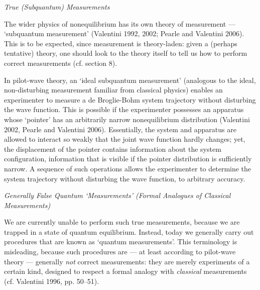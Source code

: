 \documentclass{article}%
\begin{document}
\begin{center}
\textit{True (Subquantum) Measurements}
\end{center}

The wider physics of nonequilibrium has its own theory of measurement ---
`subquantum measurement' (Valentini 1992, 2002; Pearle and Valentini 2006).
This is to be expected, since measurement is theory-laden: given a (perhaps
tentative) theory, one should look to the theory itself to tell us how to
perform correct measurements (cf. section 8).

In pilot-wave theory, an `ideal subquantum measurement' (analogous to the
ideal, non-disturbing measurement familiar from classical physics) enables an
experimenter to measure a de Broglie-Bohm system trajectory without disturbing
the wave function. This is possible if the experimenter possesses an apparatus
whose `pointer' has an arbitrarily narrow nonequilibrium distribution
(Valentini 2002, Pearle and Valentini 2006). Essentially, the system and
apparatus are allowed to interact so weakly that the joint wave function
hardly changes; yet, the displacement of the pointer contains information
about the system configuration, information that is visible if the pointer
distribution is sufficiently narrow. A sequence of such operations allows the
experimenter to determine the system trajectory without disturbing the wave
function, to arbitrary accuracy.

\begin{center}
\textit{Generally False Quantum `Measurements' (Formal Analogues of Classical
Measurements)}
\end{center}

We are currently unable to perform such true measurements, because we are
trapped in a state of quantum equilibrium. Instead, today we generally carry
out procedures that are known as `quantum measurements'. This terminology is
misleading, because such procedures are --- at least according to pilot-wave
theory --- generally \textit{not} correct measurements: they are merely
experiments of a certain kind, designed to respect a formal analogy with
\textit{classical} measurements (cf. Valentini 1996, pp. 50--51).
\end{document}
